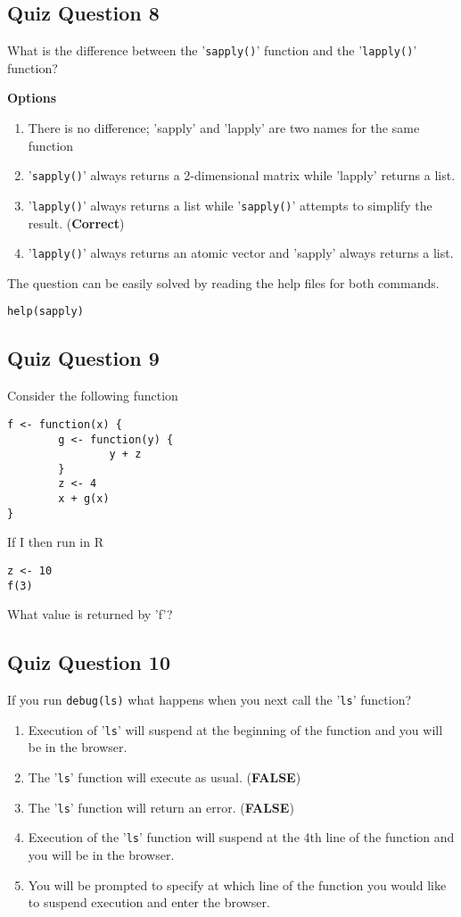 \documentclass[12pt]{article}
\begin{document}
\subsection{Quiz Question 8}
What is the difference between the '\texttt{sapply()}' function and the '\texttt{lapply()}' function?

\textbf{Options}
\begin{enumerate}
\item There is no difference; 'sapply' and 'lapply' are two names for the same function
\item '\texttt{sapply()}' always returns a 2-dimensional matrix while 'lapply' returns a list.
\item '\texttt{lapply()}' always returns a list while '\texttt{sapply()}' attempts to simplify the result. (\textbf{Correct})
\item '\texttt{lapply()}' always returns an atomic vector and 'sapply' always returns a list.
\end{enumerate}

\noindent The question can be easily solved by reading the help files for both commands.
\begin{verbatim}
help(sapply)
\end{verbatim}
\newpage
\subsection{Quiz Question 9}
Consider the following function
\begin{verbatim}
f <- function(x) {
        g <- function(y) {
                y + z
        }
        z <- 4
        x + g(x)
}
\end{verbatim}

If I then run in R
\begin{verbatim}
z <- 10
f(3)
\end{verbatim}
What value is returned by 'f'?

\newpage
\subsection{Quiz Question 10}
If you run
\texttt{debug(ls)}
what happens when you next call the '\texttt{ls}' function?
\begin{enumerate}
\item Execution of '\texttt{ls}' will suspend at the beginning of the function and you will be in the browser.
\item The '\texttt{ls}' function will execute as usual. (\textbf{FALSE})
\item The '\texttt{ls}' function will return an error. (\textbf{FALSE})
\item Execution of the '\texttt{ls}' function will suspend at the 4th line of the function and you will be in the browser.
\item You will be prompted to specify at which line of the function you would like to suspend execution and enter the browser.
\end{enumerate}
\end{document}
